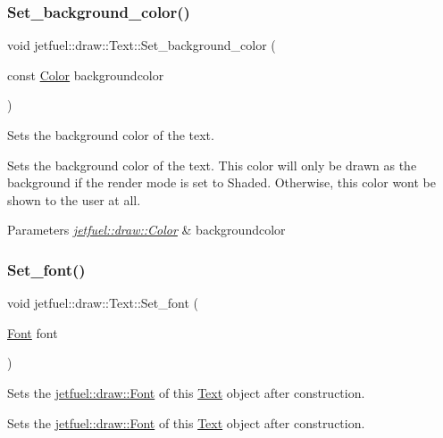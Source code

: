 \subsubsection{\texorpdfstring{Set\+\_\+background\+\_\+color()}{Set\_background\_color()}}
{\footnotesize\ttfamily void jetfuel\+::draw\+::\+Text\+::\+Set\+\_\+background\+\_\+color (\begin{DoxyParamCaption}\item[{const \hyperlink{classjetfuel_1_1draw_1_1Color}{Color}}]{backgroundcolor }\end{DoxyParamCaption})\hspace{0.3cm}{\ttfamily [inline]}}



Sets the background color of the text. 

Sets the background color of the text. This color will only be drawn as the background if the render mode is set to Shaded. Otherwise, this color won\textquotesingle{}t be shown to the user at all.


\begin{DoxyParams}{Parameters}
{\em \hyperlink{classjetfuel_1_1draw_1_1Color}{jetfuel\+::draw\+::\+Color}} & backgroundcolor \\
\hline
\end{DoxyParams}
\mbox{\label{classjetfuel_1_1draw_1_1Text_a8b8f2cd4cda3d31098cc0f5535fb7f7a}} 
\subsubsection{\texorpdfstring{Set\+\_\+font()}{Set\_font()}}
{\footnotesize\ttfamily void jetfuel\+::draw\+::\+Text\+::\+Set\+\_\+font (\begin{DoxyParamCaption}\item[{\hyperlink{classjetfuel_1_1draw_1_1Font}{Font}}]{font }\end{DoxyParamCaption})}



Sets the \hyperlink{classjetfuel_1_1draw_1_1Font}{jetfuel\+::draw\+::\+Font} of this \hyperlink{classjetfuel_1_1draw_1_1Text}{Text} object after construction. 

Sets the \hyperlink{classjetfuel_1_1draw_1_1Font}{jetfuel\+::draw\+::\+Font} of this \hyperlink{classjetfuel_1_1draw_1_1Text}{Text} object after construction.


